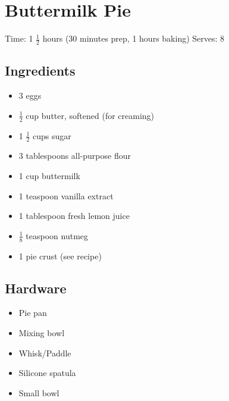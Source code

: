 \section{Buttermilk Pie}
\label{buttermilkPie}
\setcounter{secnumdepth}{0}
Time: 1 \( \frac{1}{2} \) hours (30 minutes prep, 1 hours baking)
Serves: 8

\begin{multicols}{2}
\subsection*{Ingredients}
\begin{itemize}
    \item 3 eggs
    \item \( \frac{1}{2} \) cup butter, softened (for creaming)
    \item 1 \( \frac{1}{2} \) cups sugar
    \item 3 tablespoons all-purpose flour
    \item 1 cup buttermilk
    \item 1 teaspoon vanilla extract
    \item 1 tablespoon fresh lemon juice
    \item \( \frac{1}{8} \) teaspoon nutmeg
    \item 1 pie crust (see  recipe)

\end{itemize}

\subsection*{Hardware}
\begin{itemize}
    \item Pie pan
    \item Mixing bowl
    \item Whisk/Paddle
    \item Silicone spatula
    \item Small bowl
\end{itemize}
\clearpage


\end{multicols}
